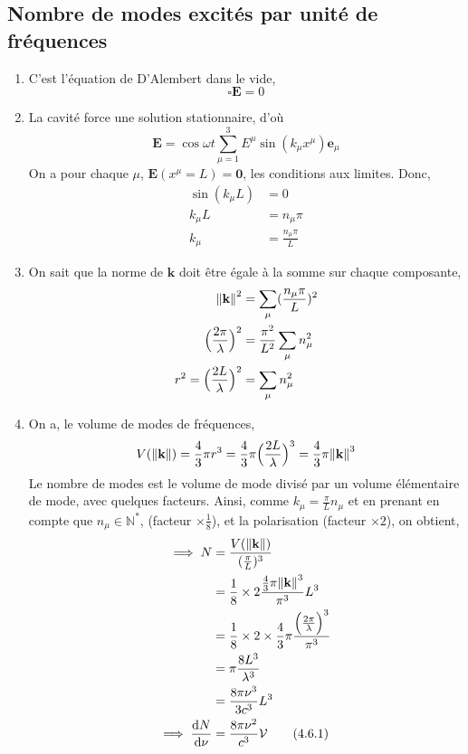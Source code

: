 \documentclass[a4paper,10pt]{report}
\begin{document}
	\subsection{Nombre de modes excités par unité de fréquences}
	\begin{enumerate}
	\item C'est l'équation de D'Alembert dans le vide, $$\square \textbf{E} = 0$$
	\item La cavité force une solution stationnaire, d'où
	$$\textbf{E} = \cos \omega t \sum_{\mu = 1}^3 E^\mu \sin(k_\mu x^\mu) \textbf{e}_\mu$$
	On a pour chaque $\mu$, $\textbf{E}(x^\mu = L) =  \textbf{0}$, les conditions aux limites.
	Donc,
	\begin{align*}
		\sin(k_\mu L) &= 0 \\
		k_\mu L &= n_\mu \pi \\
		k_\mu &= \frac{n_\mu \pi}{L}
	\end{align*}
	\item On sait que la norme de $\textbf{k}$ doit être égale à la somme sur chaque composante, 
	\begin{align*}
\norm{\textbf{k}}^2 &= \sum_\mu (\frac{n_\mu \pi}{L})^2 \\
\Bigl(\frac{2\pi}{\lambda}\Bigr)^2 &= \frac{\pi^2}{L^2}\sum_\mu n_\mu ^2\\
r^2 = \Bigl(\frac{2L}{\lambda}\Bigr)^2 &= \sum_\mu n_\mu ^2
	\end{align*}
	
	\item On a, le volume de modes de fréquences,
	$$V(\norm{\textbf{k}}) = \frac 4 3 \pi r^3 = \frac 4 3 \pi \Bigl(\frac{2L}{\lambda}\Bigr)^3 = \frac 4 3 \pi \norm{\textbf{k}}^3$$
Le nombre de modes est le volume de mode divisé par un volume élémentaire de mode, avec quelques facteurs.	Ainsi, comme $k_\mu = \frac \pi L n_\mu$ et en prenant en compte que $n_\mu \in \mathbb{N}^*$, (facteur $\times \frac 1 8$), et la polarisation (facteur $\times 2$), on obtient, 
	\begin{align*}
		\implies N&= \frac{V(\norm{\textbf{k}})}{(\frac \pi L)^3} \\
		&= \frac 1 8 \times 2 \frac{ \frac 4 3 \pi \norm{\textbf{k}}^3}{\pi^3} L^3 \\
		&= \frac 1 8 \times 2 \times \frac 4 3 \pi \frac { \Bigl(\frac{2 \pi}{\lambda}\Bigr)^3} {\pi^3}\\
	 &= \pi \frac{8 L ^3}{\lambda^3} \\
	&= \frac{8\pi \nu^3}{3 c^3}L^3 \\
		\implies \frac{\dd N}{\dd \nu} &= \frac{8\pi \nu^2}{c^3}\mathcal V \label{eq:Nnu}\tag{4.6.1}
	\end{align*}

	
	\end{enumerate}
\end{document}
